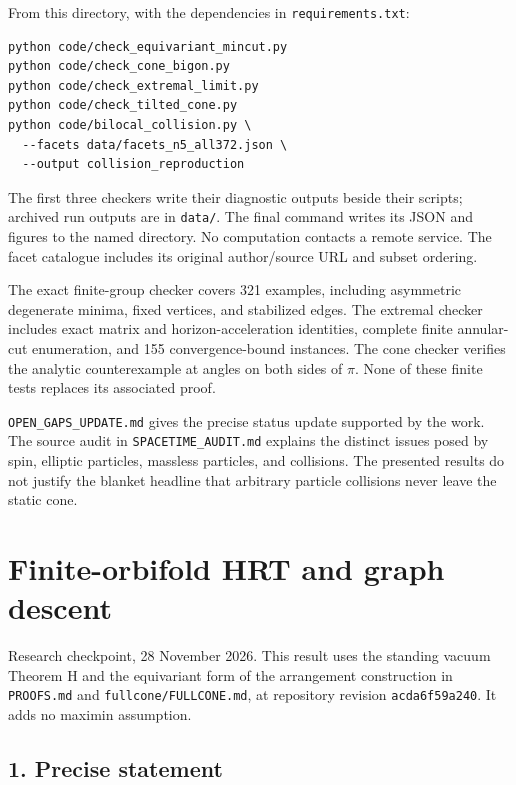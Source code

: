 \documentclass[11pt]{article}
\begin{document}
From this directory, with the dependencies in \texttt{requirements.txt}:

\begin{verbatim}
python code/check_equivariant_mincut.py
python code/check_cone_bigon.py
python code/check_extremal_limit.py
python code/check_tilted_cone.py
python code/bilocal_collision.py \
  --facets data/facets_n5_all372.json \
  --output collision_reproduction
\end{verbatim}

The first three checkers write their diagnostic outputs beside their
scripts; archived run outputs are in \texttt{data/}. The final command
writes its JSON and figures to the named directory. No computation
contacts a remote service. The facet catalogue includes its original
author/source URL and subset ordering.

The exact finite-group checker covers 321 examples, including asymmetric
degenerate minima, fixed vertices, and stabilized edges. The extremal
checker includes exact matrix and horizon-acceleration identities,
complete finite annular-cut enumeration, and 155 convergence-bound
instances. The cone checker verifies the analytic counterexample at
angles on both sides of \(\pi\). None of these finite tests replaces its
associated proof.

\texttt{OPEN\_\allowbreak GAPS\_\allowbreak UPDATE.md} gives the precise status update supported
by the work. The source audit in \texttt{SPACETIME\_\allowbreak AUDIT.md} explains
the distinct issues posed by spin, elliptic particles, massless
particles, and collisions. The presented results do not justify the
blanket headline that arbitrary particle collisions never leave the
static cone.

\clearpage

\section{Finite-orbifold HRT and graph
descent}\label{finite-orbifold-hrt-and-graph-descent}

Research checkpoint, 28 November 2026. This result uses the standing
vacuum Theorem H and the equivariant form of the arrangement
construction in \texttt{PROOFS.md} and \texttt{fullcone/FULLCONE.md}, at
repository revision \texttt{acda6f59a240}. It adds no maximin
assumption.

\subsection{1. Precise statement}\label{precise-statement}
\end{document}
